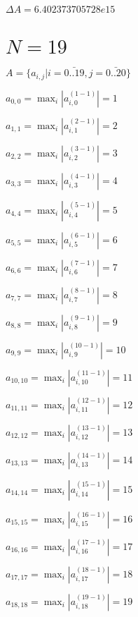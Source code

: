 \documentclass[a4paper,12pt]{article}
\begin{document}
$\Delta A = 6.402373705728e15$



\section{ $N = 19$ }
$A = \{ a _{ i, j } | i = \bar { 0..19 }, j = \bar { 0..20 } \}$

$a _{ 0, 0 } =  \max _i |a _{ i, 0 } ^{ (1 - 1) } | = 1$

$a _{ 1, 1 } =  \max _i |a _{ i, 1 } ^{ (2 - 1) } | = 2$

$a _{ 2, 2 } =  \max _i |a _{ i, 2 } ^{ (3 - 1) } | = 3$

$a _{ 3, 3 } =  \max _i |a _{ i, 3 } ^{ (4 - 1) } | = 4$

$a _{ 4, 4 } =  \max _i |a _{ i, 4 } ^{ (5 - 1) } | = 5$

$a _{ 5, 5 } =  \max _i |a _{ i, 5 } ^{ (6 - 1) } | = 6$

$a _{ 6, 6 } =  \max _i |a _{ i, 6 } ^{ (7 - 1) } | = 7$

$a _{ 7, 7 } =  \max _i |a _{ i, 7 } ^{ (8 - 1) } | = 8$

$a _{ 8, 8 } =  \max _i |a _{ i, 8 } ^{ (9 - 1) } | = 9$

$a _{ 9, 9 } =  \max _i |a _{ i, 9 } ^{ (10 - 1) } | = 10$

$a _{ 10, 10 } =  \max _i |a _{ i, 10 } ^{ (11 - 1) } | = 11$

$a _{ 11, 11 } =  \max _i |a _{ i, 11 } ^{ (12 - 1) } | = 12$

$a _{ 12, 12 } =  \max _i |a _{ i, 12 } ^{ (13 - 1) } | = 13$

$a _{ 13, 13 } =  \max _i |a _{ i, 13 } ^{ (14 - 1) } | = 14$

$a _{ 14, 14 } =  \max _i |a _{ i, 14 } ^{ (15 - 1) } | = 15$

$a _{ 15, 15 } =  \max _i |a _{ i, 15 } ^{ (16 - 1) } | = 16$

$a _{ 16, 16 } =  \max _i |a _{ i, 16 } ^{ (17 - 1) } | = 17$

$a _{ 17, 17 } =  \max _i |a _{ i, 17 } ^{ (18 - 1) } | = 18$

$a _{ 18, 18 } =  \max _i |a _{ i, 18 } ^{ (19 - 1) } | = 19$
\end{document}
